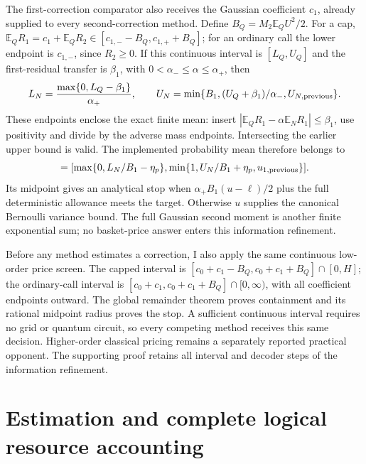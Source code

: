 \documentclass[11pt]{article}
\newcommand{\E}{\mathbb E}
\begin{document}
The first-correction comparator also receives the Gaussian coefficient
$c_1$, already supplied to every second-correction method. Define
$B_Q=M_2\E_Q U^2/2$. For a cap,
$\E_Q R_1=c_1+\E_Q R_2\in[c_{1,-}-B_Q,c_{1,+}+B_Q]$;
for an ordinary call the lower endpoint is $c_{1,-}$, since $R_2\geq0$.
If this continuous interval is $[L_Q,U_Q]$ and the first-residual transfer
is $\beta_1$, with $0<\alpha_-\leq\alpha\leq\alpha_+$, then
\begin{equation}
 L_N=\frac{\max\{0,L_Q-\beta_1\}}{\alpha_+},\qquad
 U_N=\min\{B_1,(U_Q+\beta_1)/\alpha_-,U_{N,\rm previous}\}.
 \label{eq:informed-first-mean}
\end{equation}
These endpoints enclose the exact finite mean: insert
$|\E_QR_1-\alpha\E_NR_1|\leq\beta_1$, use positivity and divide by
the adverse mass endpoints. Intersecting the earlier upper bound is valid.
The implemented probability mean therefore belongs to
\begin{equation}
 [\ell,u]=[\max\{0,L_N/B_1-\eta_p\},
           \min\{1,U_N/B_1+\eta_p,u_{1,\rm previous}\}].
\end{equation}
Its midpoint gives an analytical stop when
$\alpha_+B_1(u-\ell)/2$ plus the full deterministic allowance meets the
target. Otherwise $u$ supplies the canonical Bernoulli variance bound.
The full Gaussian second moment is another finite exponential sum; no
basket-price answer enters this information refinement.

Before any method estimates a correction, I also apply the same continuous
low-order price screen. The capped interval is
$[c_0+c_1-B_Q,c_0+c_1+B_Q]\cap[0,H]$; the ordinary-call interval is
$[c_0+c_1,c_0+c_1+B_Q]\cap[0,\infty)$, with all coefficient endpoints
outward. The global remainder theorem proves containment and its rational
midpoint radius proves the stop. A sufficient continuous interval requires
no grid or quantum circuit, so every competing method receives this same
decision. Higher-order classical pricing remains a separately reported
practical opponent. The supporting proof retains all interval and decoder
steps of the information refinement.

\section{Estimation and complete logical resource accounting}
\label{sec:estimation}
\end{document}
